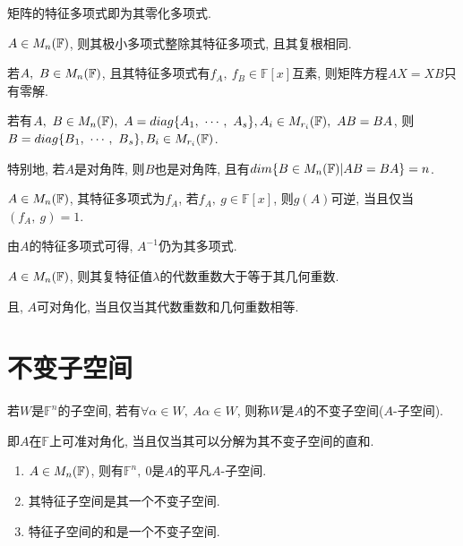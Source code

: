 \begin{theorem}
    矩阵的特征多项式即为其零化多项式.
\end{theorem}

\begin{inference}
    $A\in M_{n}(\mathbb{F})$, 则其极小多项式整除其特征多项式, 且其复根相同.
\end{inference}

\begin{inference}
    若$A,\ B\in M_{n}(\mathbb{F})$, 且其特征多项式有$f_A,\ f_B\in \mathbb{F}[x]$互素, 则矩阵方程$AX=XB$只有零解.
\end{inference}

\begin{inference}
    若有$\ainmnf{A,\ B},\ A=diag\{\vectorset{A}{s}\}, A_i\in \matrixfield{r_i}{F},\ AB=BA$, 则$B=diag\{{B}{_1},\ \cdots,\ {B}{_{s}}\}, B_i\in M_{r_i}(\mathbb{F})$.\par
    特别地, 若$A$是对角阵, 则$B$也是对角阵, 且有$dim\{B\in M_{n}(\mathbb{F})|AB=BA\}=n$.
\end{inference}

\begin{example}
    $A\in M_{n}(\mathbb{F})$, 其特征多项式为$f_A$, 若$f_A,\ g\in\mathbb{F}[x]$, 则$g(A)$可逆, 当且仅当$(f_A,\ g)=1$.
\end{example}

\begin{example}
    由$A$的特征多项式可得, $A^{-1}$仍为其多项式.
\end{example}

\begin{example}
    $A\in M_{n}(\mathbb{F})$, 则其复特征值$\lambda$的代数重数大于等于其几何重数.\par
    且, $A$可对角化, 当且仅当其代数重数和几何重数相等.
\end{example}


\section{ 不变子空间 }

\begin{definition}[不变子空间]
    若$W$是$\mathbb{F}^n$的子空间, 若有$\forall \alpha \in W,\ A\alpha \in W$, 则称$W$是$A$的不变子空间($A$-子空间).\par
    即$A$在$\mathbb{F}$上可准对角化, 当且仅当其可以分解为其不变子空间的直和.
\end{definition}

\begin{example}
    \begin{enumerate}[itemindent=1em]
        \item $A\in M_{n}(\mathbb{F})$, 则有$\mathbb{F}^n,\ 0$是$A$的平凡$A$-子空间.
        \item 其特征子空间是其一个不变子空间.
        \item 特征子空间的和是一个不变子空间.
    \end{enumerate}
\end{example}

